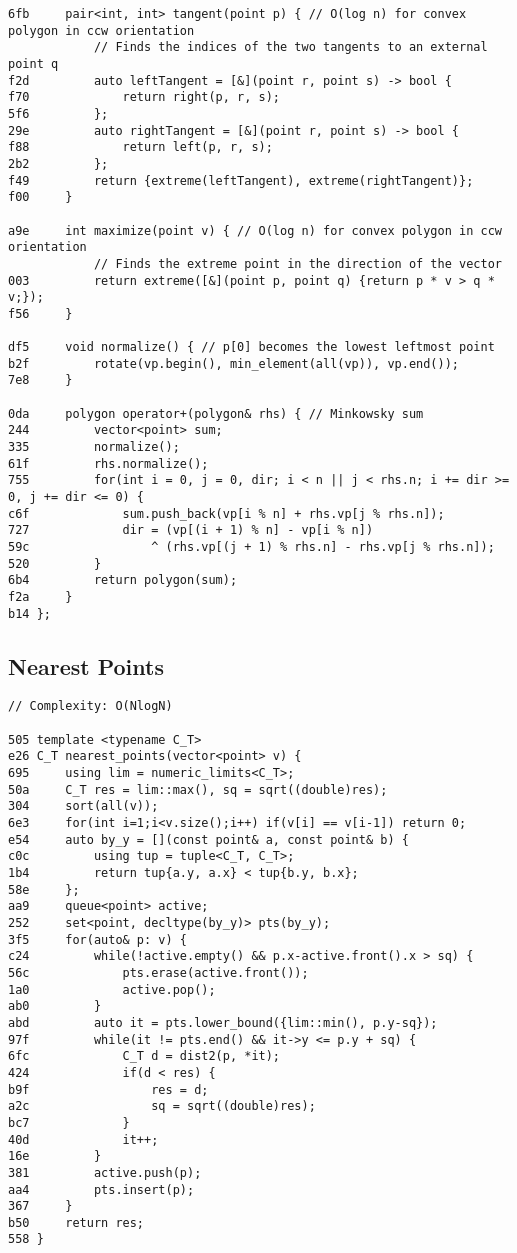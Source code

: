 \documentclass[11pt, a4paper, twoside]{article}
\begin{document}
\begin{lstlisting}
6fb 	pair<int, int> tangent(point p) { // O(log n) for convex polygon in ccw orientation
    		// Finds the indices of the two tangents to an external point q
f2d 		auto leftTangent = [&](point r, point s) -> bool {
f70 			return right(p, r, s);
5f6 		};
29e 		auto rightTangent = [&](point r, point s) -> bool {
f88 			return left(p, r, s);
2b2 		};
f49 		return {extreme(leftTangent), extreme(rightTangent)};
f00 	}
    
a9e 	int maximize(point v) { // O(log n) for convex polygon in ccw orientation
    		// Finds the extreme point in the direction of the vector
003 		return extreme([&](point p, point q) {return p * v > q * v;});
f56 	}
    
df5 	void normalize() { // p[0] becomes the lowest leftmost point 
b2f 		rotate(vp.begin(), min_element(all(vp)), vp.end());
7e8 	}
    
0da 	polygon operator+(polygon& rhs) { // Minkowsky sum
244 		vector<point> sum;
335 		normalize();
61f 		rhs.normalize();
755 		for(int i = 0, j = 0, dir; i < n || j < rhs.n; i += dir >= 0, j += dir <= 0) {
c6f 			sum.push_back(vp[i % n] + rhs.vp[j % rhs.n]);
727 			dir = (vp[(i + 1) % n] - vp[i % n]) 
59c 				^ (rhs.vp[(j + 1) % rhs.n] - rhs.vp[j % rhs.n]);
520 		}
6b4 		return polygon(sum);
f2a 	}
b14 };
\end{lstlisting}

\subsection{Nearest Points}
\begin{lstlisting}
// Complexity: O(NlogN)

505 template <typename C_T>
e26 C_T nearest_points(vector<point> v) {
695 	using lim = numeric_limits<C_T>;
50a 	C_T res = lim::max(), sq = sqrt((double)res);
304 	sort(all(v));
6e3 	for(int i=1;i<v.size();i++) if(v[i] == v[i-1]) return 0;
e54 	auto by_y = [](const point& a, const point& b) {
c0c 		using tup = tuple<C_T, C_T>;
1b4 		return tup{a.y, a.x} < tup{b.y, b.x};
58e 	};
aa9 	queue<point> active;
252 	set<point, decltype(by_y)> pts(by_y);
3f5 	for(auto& p: v) {
c24 		while(!active.empty() && p.x-active.front().x > sq) {
56c 			pts.erase(active.front());
1a0 			active.pop();
ab0 		}
abd 		auto it = pts.lower_bound({lim::min(), p.y-sq});
97f 		while(it != pts.end() && it->y <= p.y + sq) {
6fc 			C_T d = dist2(p, *it);
424 			if(d < res) {
b9f 				res = d;
a2c 				sq = sqrt((double)res);
bc7 			}
40d 			it++;
16e 		}
381 		active.push(p);
aa4 		pts.insert(p);
367 	}
b50 	return res;
558 }
\end{lstlisting}
\end{document}
